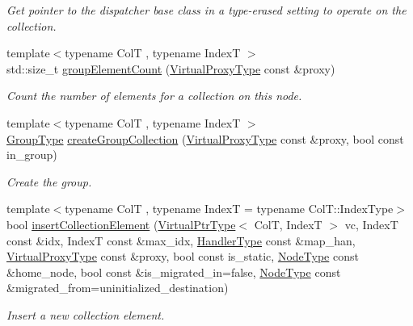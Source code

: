 \begin{DoxyCompactItemize}
\begin{DoxyCompactList}\small\item\em Get pointer to the dispatcher base class in a type-\/erased setting to operate on the collection. \end{DoxyCompactList}\item 
{\footnotesize template$<$typename ColT , typename IndexT $>$ }\\std\+::size\+\_\+t \hyperlink{structvt_1_1vrt_1_1collection_1_1_collection_manager_a93b0cf22a65db97cd5816c01191b9d8d}{group\+Element\+Count} (\hyperlink{namespacevt_a1b417dd5d684f045bb58a0ede70045ac}{Virtual\+Proxy\+Type} const \&proxy)
\begin{DoxyCompactList}\small\item\em Count the number of elements for a collection on this node. \end{DoxyCompactList}\item 
{\footnotesize template$<$typename ColT , typename IndexT $>$ }\\\hyperlink{namespacevt_a27b5e4411c9b6140c49100e050e2f743}{Group\+Type} \hyperlink{structvt_1_1vrt_1_1collection_1_1_collection_manager_a05de48c4386d84532b19a96b0cefc172}{create\+Group\+Collection} (\hyperlink{namespacevt_a1b417dd5d684f045bb58a0ede70045ac}{Virtual\+Proxy\+Type} const \&proxy, bool const in\+\_\+group)
\begin{DoxyCompactList}\small\item\em Create the group. \end{DoxyCompactList}\item 
{\footnotesize template$<$typename ColT , typename IndexT  = typename Col\+T\+::\+Index\+Type$>$ }\\bool \hyperlink{structvt_1_1vrt_1_1collection_1_1_collection_manager_afc919bd549505ed40c3e1a41623d569a}{insert\+Collection\+Element} (\hyperlink{structvt_1_1vrt_1_1collection_1_1_collection_manager_a1da9015e52d6ecca955f57b59aab0b82}{Virtual\+Ptr\+Type}$<$ ColT, IndexT $>$ vc, IndexT const \&idx, IndexT const \&max\+\_\+idx, \hyperlink{namespacevt_af64846b57dfcaf104da3ef6967917573}{Handler\+Type} const \&map\+\_\+han, \hyperlink{namespacevt_a1b417dd5d684f045bb58a0ede70045ac}{Virtual\+Proxy\+Type} const \&proxy, bool const is\+\_\+static, \hyperlink{namespacevt_a866da9d0efc19c0a1ce79e9e492f47e2}{Node\+Type} const \&home\+\_\+node, bool const \&is\+\_\+migrated\+\_\+in=false, \hyperlink{namespacevt_a866da9d0efc19c0a1ce79e9e492f47e2}{Node\+Type} const \&migrated\+\_\+from=uninitialized\+\_\+destination)
\begin{DoxyCompactList}\small\item\em Insert a new collection element. \end{DoxyCompactList}\item 

\end{DoxyCompactItemize}
